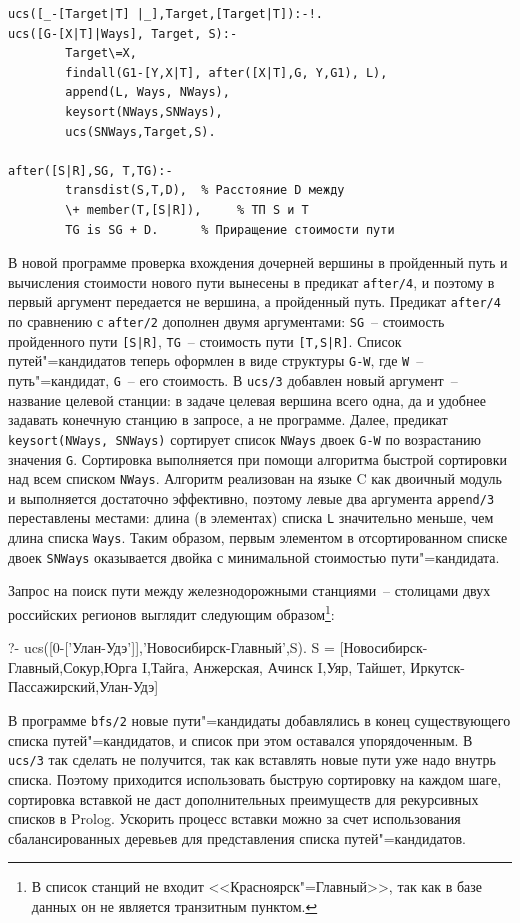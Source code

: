 \documentclass[a4paper,14pt, openany, twoside, final]{extbook} %
\begin{document}
\begin{verbatim}
ucs([_-[Target|T] |_],Target,[Target|T]):-!.
ucs([G-[X|T]|Ways], Target, S):-
        Target\=X,
        findall(G1-[Y,X|T], after([X|T],G, Y,G1), L),
        append(L, Ways, NWays),
        keysort(NWays,SNWays),
        ucs(SNWays,Target,S).

after([S|R],SG, T,TG):-
        transdist(S,T,D),  % Расстояние D между
        \+ member(T,[S|R]),     % ТП S и T
        TG is SG + D.      % Приращение стоимости пути
\end{verbatim}


В новой программе проверка вхождения дочерней вершины в пройденный путь и вычисления стоимости нового пути вынесены в предикат \texttt{after/4}, и поэтому в первый аргумент передается не вершина, а пройденный путь.  Предикат \texttt{after/4} по сравнению с \texttt{after/2} дополнен двумя аргументами: \texttt{SG}~-- стоимость пройденного пути \texttt{[S|R]}, \texttt{TG}~-- стоимость пути \texttt{[T,S|R]}.  Список путей"=кандидатов теперь оформлен в виде структуры \texttt{G-W}, где \texttt{W}~-- путь"=кандидат, \texttt{G}~-- его стоимость.  В \texttt{ucs/3} добавлен новый аргумент~-- название целевой станции: в задаче целевая вершина всего одна, да и удобнее задавать конечную станцию в запросе, а не программе.  Далее, предикат \texttt{keysort(NWays, SNWays)} сортирует список \texttt{NWays} двоек \texttt{G-W} по возрастанию значения \texttt{G}.  Сортировка выполняется при помощи алгоритма быстрой сортировки над всем списком \texttt{NWays}.  Алгоритм реализован на языке C как двоичный модуль и выполняется достаточно эффективно, поэтому левые два аргумента \texttt{append/3} переставлены местами: длина (в элементах) списка \texttt{L} значительно меньше, чем длина списка \texttt{Ways}.  Таким образом, первым элементом в отсортированном списке двоек \texttt{SNWays} оказывается двойка с минимальной стоимостью пути"=кандидата.

Запрос на поиск пути между железнодорожными станциями~-- столицами двух российских регионов выглядит следующим образом\footnote{В список станций не входит <<Красноярск"=Главный>>, так как в базе данных он не является транзитным пунктом.}:

\begin{proexp}
?- ucs([0-['Улан-Удэ']],'Новосибирск-Главный',S).
S = [Новосибирск-Главный,Сокур,Юрга I,Тайга, Анжерская,
     Ачинск I,Уяр, Тайшет, Иркутск-Пассажирский,Улан-Удэ]
\end{proexp}


В программе \texttt{bfs/2} новые пути"=кандидаты добавлялись в конец существующего списка путей"=кандидатов, и список при этом оставался упорядоченным.  В \texttt{ucs/3} так сделать не получится, так как вставлять новые пути уже надо внутрь списка.  Поэтому приходится использовать быструю сортировку на каждом шаге, сортировка вставкой не даст дополнительных преимуществ для рекурсивных списков в Prolog.  Ускорить процесс вставки можно за счет использования сбалансированных деревьев для представления списка путей"=кандидатов.
\end{document}
